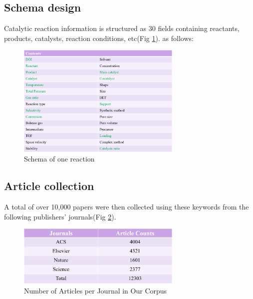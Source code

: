 \documentclass[%
 aip,
 jmp,%
 amsmath,amssymb,
 reprint,%
]{revtex4-2}
\begin{document}
\subsection{Schema design}
Catalytic reaction information is structured as 30 fields containing reactants, products, catalysts, reaction conditions, etc(Fig \ref{ Fig.5 }). as follows:
\begin{figure}[htbp]
 \centering
 \includegraphics[width=0.7\textwidth]{figure/5.png}
 \caption{ Schema of one reaction }
 \label{ Fig.5 }
\end{figure}
\subsection{Article collection}
A total of over 10,000 papers were then collected using these keywords from the following publishers' journals(Fig \ref{ Fig.6 }).
\begin{figure}[htbp]
 \centering
 \includegraphics[width=0.7\textwidth]{figure/6.png}
 \caption{ Number of Articles per Journal in Our Corpus }
 \label{ Fig.6 }
\end{figure}
\end{document}
